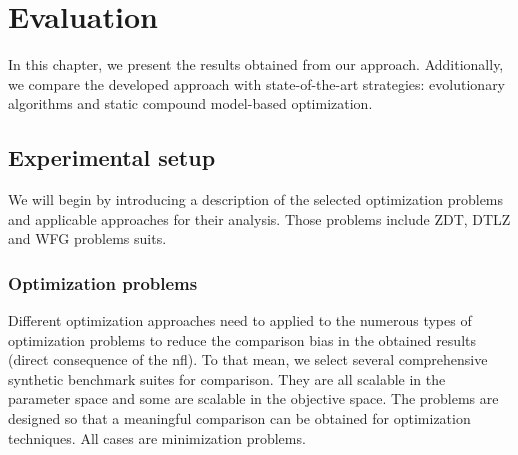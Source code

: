 \chapter{Evaluation}\label{sec:evaluation}

In this chapter, we present the results obtained from our approach. Additionally, we compare the developed approach with state-of-the-art strategies: evolutionary algorithms and static compound model-based optimization.


\section{Experimental setup}
    We will begin by introducing a description of the selected optimization problems and applicable approaches for their analysis. Those problems include ZDT, DTLZ and WFG problems suits. 

    \subsection{Optimization problems}
    Different optimization approaches need to applied to the numerous types of optimization problems to reduce the comparison bias in the obtained results (direct consequence of the \gls{nfl}). To that mean, we select several comprehensive synthetic benchmark suites for comparison. They are all scalable in the parameter space and some are scalable in the objective space. The problems are designed so that a meaningful comparison can be obtained for optimization techniques. All cases are minimization problems.

